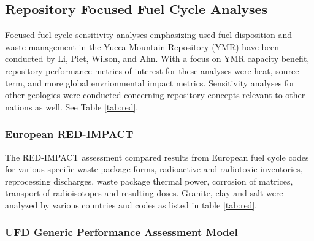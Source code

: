 \subsection{Repository Focused Fuel Cycle Analyses}

Focused fuel cycle sensitivity analyses emphasizing used fuel disposition and
waste management in the Yucca Mountain Repository (YMR) have been conducted by
Li, Piet, Wilson, and Ahn. With a focus on YMR capacity benefit, repository
performance metrics of interest for these analyses were heat, source term, and
more global envrionmental impact metrics.  Sensitivity analyses for other
geologies were conducted concerning repository concepts relevant to other
nations as well. See Table \ref{tab:red}.

\subsubsection{European RED-IMPACT} 

The RED-IMPACT assessment compared
results from European fuel cycle codes for various specific waste package
forms, radioactive and radiotoxic inventories, reprocessing discharges,  waste
package thermal power, corrosion of matrices, transport of radioisotopes and
resulting doses.  Granite, clay and salt were analyzed by various countries and 
codes as listed in table \ref{tab:red}.






\clearpage
\subsubsection{UFD Generic Performance Assessment Model}

